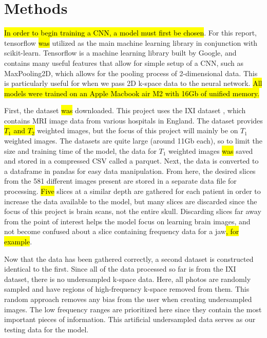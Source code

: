 \documentclass[14pt]{extreport}
\begin{document}
    \section*{Methods}
        \hl{In order to begin training a CNN, a model must first be chosen}. For this report, tensorflow \hl{was} utilized as the main machine learning library in conjunction with scikit-learn. Tensorflow is a machine learning library built by Google, and contains many useful features that allow for simple setup of a CNN, such as MaxPooling2D, which allows for the pooling process of 2-dimensional data. This is particularly useful for when we pass 2D k-space data to the neural network. \hl{All models were trained on an Apple Macbook air M2 with 16Gb of unified memory.}

        First, the dataset \hl{was} downloaded. This project uses the IXI dataset \cite{IXI_Dataset}, which contains MRI image data from various hospitals in England. The dataset provides \hl{$T_1$ and $T_2$} weighted images, but the focus of this project will mainly be on $T_1$ weighted images. The datasets are quite large (around 11Gb each), so to limit the size and training time of the model, the data for $T_1$ weighted images \hl{was} saved and stored in a compressed CSV called a parquet. Next, the data is converted to a dataframe in pandas for easy data manipulation. From here, the desired slices from the 581 different images present are stored in a separate data file for processing. \hl{Five} slices at a similar depth are gathered for each patient in order to increase the data available to the model, but many slices are discarded since the focus of this project is brain scans, not the entire skull. Discarding slices far away from the point of interest helps the model focus on learning brain images, and not become confused about a slice containing frequency data for a jaw\hl{, for example}. 

        Now that the data has been gathered correctly, a second dataset is constructed identical to the first. Since all of the data processed so far is from the IXI dataset, there is no undersampled k-space data. Here, all photos are randomly sampled and have regions of high-frequency k-space removed from them. This random approach removes any bias from the user when creating undersampled images. The low frequency ranges are prioritized here since they contain the most important pieces of information. This artificial undersampled data serves as our testing data for the model. 
\end{document}
